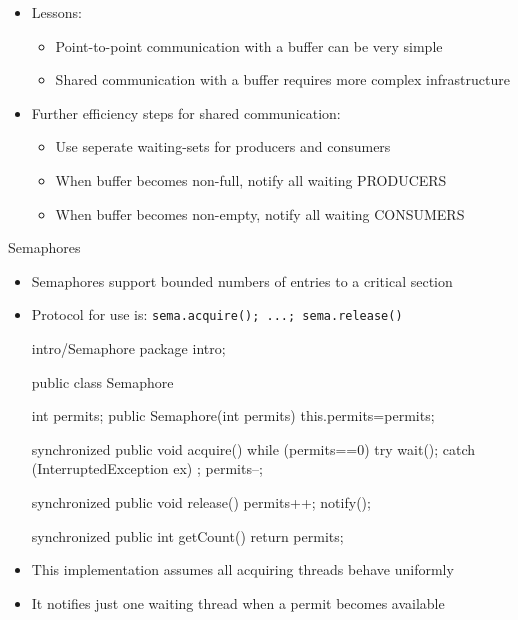 \documentclass{concdistfoils}
\def\heading#1{\begin{cframed}[8.8in]{#1}\end{cframed}}
\begin{document}
\begin{slide}
\begin{itemize}
\item Lessons:
\begin{itemize}
\item Point-to-point communication with a buffer can be very simple
\item Shared communication with a buffer requires more complex infrastructure
\end{itemize}
\vfill
\item Further efficiency steps for shared communication:
\begin{itemize}
\item Use seperate waiting-sets for producers and consumers
\item When buffer becomes non-full, notify all waiting PRODUCERS
\item When buffer becomes non-empty, notify all waiting CONSUMERS
\end{itemize}
\end{itemize}
\vfill
\end{slide}

\begin{slide}
\heading{Semaphores}
\vfill

\begin{itemize}
\item Semaphores support bounded numbers of entries to a critical section
\item Protocol for use is: \texttt{sema.acquire(); ...; sema.release()}
\vfill
\begin{hideclass}{intro/Semaphore}
package intro;
\end{hideclass}
\begin{class}{}
public class Semaphore
{ int permits;
  public Semaphore(int permits) { this.permits=permits; }
  
  synchronized public void acquire()
  { while (permits==0) try { wait(); } catch (InterruptedException ex) {};
    permits--;
  }
  
  synchronized public void release() { permits++; notify(); }
  
  synchronized public int getCount() { return permits; }
}
\end{class}
\vfill
\item This implementation assumes all acquiring threads behave uniformly
\item It notifies just one waiting thread when a permit becomes available
\end{itemize}

\end{slide}
\end{document}
